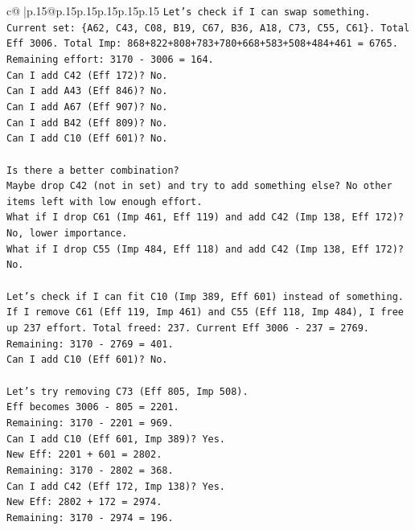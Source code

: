 \documentclass{article}
\begin{document}
{\begin{supertabular}{c@{$\;$}|p{.15\linewidth}@{}p{.15\linewidth}p{.15\linewidth}p{.15\linewidth}p{.15\linewidth}p{.15\linewidth}}
{{{\texttt{Let's check if I can swap something.} \\
\texttt{Current set: \{A62, C43, C08, B19, C67, B36, A18, C73, C55, C61\}. Total Eff 3006. Total Imp: 868+822+808+783+780+668+583+508+484+461 = 6765.} \\
\texttt{Remaining effort: 3170 {-} 3006 = 164.} \\
\texttt{Can I add C42 (Eff 172)? No.} \\
\texttt{Can I add A43 (Eff 846)? No.} \\
\texttt{Can I add A67 (Eff 907)? No.} \\
\texttt{Can I add B42 (Eff 809)? No.} \\
\texttt{Can I add C10 (Eff 601)? No.} \\
\\ 
\texttt{Is there a better combination?} \\
\texttt{Maybe drop C42 (not in set) and try to add something else? No other items left with low enough effort.} \\
\texttt{What if I drop C61 (Imp 461, Eff 119) and add C42 (Imp 138, Eff 172)? No, lower importance.} \\
\texttt{What if I drop C55 (Imp 484, Eff 118) and add C42 (Imp 138, Eff 172)? No.} \\
\\ 
\texttt{Let's check if I can fit C10 (Imp 389, Eff 601) instead of something.} \\
\texttt{If I remove C61 (Eff 119, Imp 461) and C55 (Eff 118, Imp 484), I free up 237 effort. Total freed: 237. Current Eff 3006 {-} 237 = 2769.} \\
\texttt{Remaining: 3170 {-} 2769 = 401.} \\
\texttt{Can I add C10 (Eff 601)? No.} \\
\\ 
\texttt{Let's try removing C73 (Eff 805, Imp 508).} \\
\texttt{Eff becomes 3006 {-} 805 = 2201.} \\
\texttt{Remaining: 3170 {-} 2201 = 969.} \\
\texttt{Can I add C10 (Eff 601, Imp 389)? Yes.} \\
\texttt{New Eff: 2201 + 601 = 2802.} \\
\texttt{Remaining: 3170 {-} 2802 = 368.} \\
\texttt{Can I add C42 (Eff 172, Imp 138)? Yes.} \\
\texttt{New Eff: 2802 + 172 = 2974.} \\
\texttt{Remaining: 3170 {-} 2974 = 196.} \\
}}}
\end{supertabular}}
\end{document}
